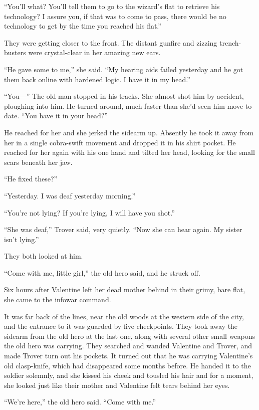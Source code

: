 “You’ll what? You’ll tell them to go to the wizard’s flat to
retrieve his technology? I assure you, if that was to come to pass,
there would be no technology to get by the time you reached his
flat.”

They were getting closer to the front. The distant gunfire and
zizzing trench-busters were crystal-clear in her amazing new ears.

“He gave some to me,” she said. “My hearing aids failed yesterday
and he got them back online with hardened logic. I have it in my
head.”

“You---” The old man stopped in his tracks. She almost shot him by
accident, ploughing into him. He turned around, much faster than
she’d seen him move to date. “You have it in your head?”

He reached for her and she jerked the sidearm up. Absently he took
it away from her in a single cobra-swift movement and dropped it in
his shirt pocket. He reached for her again with his one hand and
tilted her head, looking for the small scars beneath her jaw.

“He fixed these?”

“Yesterday. I was deaf yesterday morning.”

“You’re not lying? If you’re lying, I will have you shot.”

“She was deaf,” Trover said, very quietly. “Now she can hear again.
My sister isn’t lying.”

They both looked at him.

“Come with me, little girl,” the old hero said, and he struck off.

\tb

Six hours after Valentine left her dead mother behind in their
grimy, bare flat, she came to the infowar command.

It was far back of the lines, near the old woods at the western
side of the city, and the entrance to it was guarded by five
checkpoints. They took away the sidearm from the old hero at the
last one, along with several other small weapons the old hero was
carrying. They searched and wanded Valentine and Trover, and made
Trover turn out his pockets. It turned out that he was carrying
Valentine’s old clasp-knife, which had disappeared some months
before. He handed it to the soldier solemnly, and she kissed his
cheek and tousled his hair and for a moment, she looked just like
their mother and Valentine felt tears behind her eyes.

“We’re here,” the old hero said. “Come with me.”

